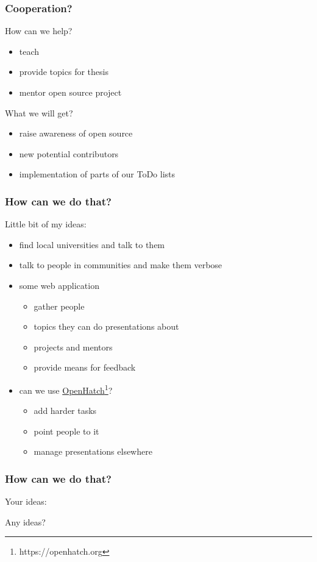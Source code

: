 \documentclass{beamer}
\newcommand{\link}[2]{{\textcolor{blue}{\href{#1}{#2\footnote{#1}}}}}
\begin{document}
\begin{frame}[t]
\frametitle{Cooperation?}
How can we help?
\begin{itemize}
	\item teach
	\item provide topics for thesis
	\item mentor open source project
\end{itemize}
\pause
\vspace{0.5cm}
What we will get?
\begin{itemize}
	\item raise awareness of open source
	\item new potential contributors
	\item implementation of parts of our ToDo lists
\end{itemize}
\end{frame}

\begin{frame}[t]
\frametitle{How can we do that?}
Little bit of my ideas:
\begin{itemize}
	\item find local universities and talk to them
	\item talk to people in communities and make them verbose
	\item some web application
	\begin{itemize}
		\item gather people
		\item topics they can do presentations about
		\item projects and mentors
		\item provide means for feedback
	\end{itemize}
	\item can we use \link{https://openhatch.org}{OpenHatch}?
	\begin{itemize}
		\item add harder tasks
		\item point people to it
		\item manage presentations elsewhere
	\end{itemize}
\end{itemize}
\end{frame}

\begin{frame}[t]
\frametitle{How can we do that?}
Your ideas:
\vspace{2cm}
\begin{center}
{\Huge Any ideas?}
\end{center}
\end{frame}

\end{document}
